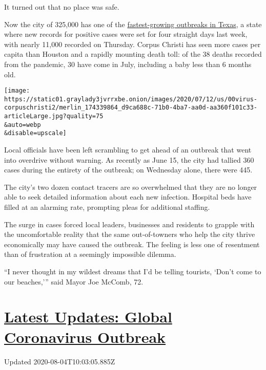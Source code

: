 It turned out that no place was safe.

Now the city of 325,000 has one of the
\href{https://www.nytimes3xbfgragh.onion/interactive/2020/us/texas-coronavirus-cases.html}{fastest-growing
outbreaks in Texas}, a state where new records for positive cases were
set for four straight days last week, with nearly 11,000 recorded on
Thursday. Corpus Christi has seen more cases per capita than Houston and
a rapidly mounting death toll: of the 38 deaths recorded from the
pandemic, 30 have come in July, including a baby less than 6 months old.

\texttt{[image: https://static01.graylady3jvrrxbe.onion/images/2020/07/12/us/00virus-corpuschristi2/merlin\_174339864\_d9ca688c-71b0-4ba7-aa0d-aa360f101c33-articleLarge.jpg?quality=75\\\&auto=webp\\\&disable=upscale]}

Local officials have been left scrambling to get ahead of an outbreak
that went into overdrive without warning. As recently as June 15, the
city had tallied 360 cases during the entirety of the outbreak; on
Wednesday alone, there were 445.

The city's two dozen contact tracers are so overwhelmed that they are no
longer able to seek detailed information about each new infection.
Hospital beds have filled at an alarming rate, prompting pleas for
additional staffing.

The surge in cases forced local leaders, businesses and residents to
grapple with the uncomfortable reality that the same out-of-towners who
help the city thrive economically may have caused the outbreak. The
feeling is less one of resentment than of frustration at a seemingly
impossible dilemma.

``I never thought in my wildest dreams that I'd be telling tourists,
`Don't come to our beaches,''' said Mayor Joe McComb, 72.

\hypertarget{latest-updates-global-coronavirus-outbreak}{%
\section{\texorpdfstring{\href{https://www.nytimes3xbfgragh.onion/2020/08/04/world/coronavirus-covid-19.html?action=click\&pgtype=Article\&state=default\&region=MAIN_CONTENT_1\&context=storylines_live_updates}{Latest
Updates: Global Coronavirus
Outbreak}}{Latest Updates: Global Coronavirus Outbreak}}\label{latest-updates-global-coronavirus-outbreak}}

Updated 2020-08-04T10:03:05.885Z

